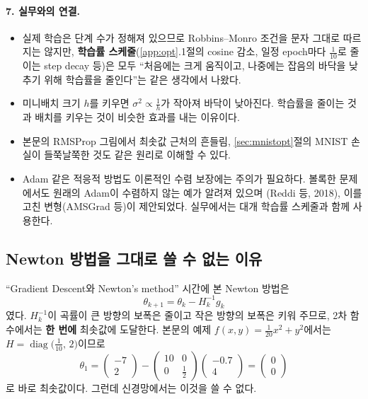 \documentclass[11pt,a4paper]{article}
\begin{document}
\paragraph{7. 실무와의 연결.}
\begin{itemize}[leftmargin=1.8em]
\item 실제 학습은 단계 수가 정해져 있으므로 Robbins--Monro 조건을 문자 그대로 따르지는 않지만,
\textbf{학습률 스케줄}(\ref{app:opt}.1절의 cosine 감소, 일정 epoch마다 $\frac1{10}$로 줄이는 step decay 등)은
모두 ``처음에는 크게 움직이고, 나중에는 잡음의 바닥을 낮추기 위해 학습률을 줄인다''는 같은 생각에서 나왔다.
\item 미니배치 크기 $h$를 키우면 $\sigma^2\propto\frac1h$가 작아져 바닥이 낮아진다.
학습률을 줄이는 것과 배치를 키우는 것이 비슷한 효과를 내는 이유이다.
\item 본문의 RMSProp 그림에서 최솟값 근처의 흔들림, \ref{sec:mnistopt}절의 MNIST 손실이 들쭉날쭉한 것도
같은 원리로 이해할 수 있다.
\item Adam 같은 적응적 방법도 이론적인 수렴 보장에는 주의가 필요하다.
볼록한 문제에서도 원래의 Adam이 수렴하지 않는 예가 알려져 있으며 (Reddi 등, 2018),
이를 고친 변형(AMSGrad 등)이 제안되었다. 실무에서는 대개 학습률 스케줄과 함께 사용한다.
\end{itemize}

\subsection{Newton 방법을 그대로 쓸 수 없는 이유}

``Gradient Descent와 Newton's method'' 시간에 본 Newton 방법은
\[
\theta_{k+1}=\theta_k-H_k^{-1}g_k
\]
였다. $H_k^{-1}$이 곡률이 큰 방향의 보폭은 줄이고 작은 방향의 보폭은 키워 주므로,
2차 함수에서는 \textbf{한 번에} 최솟값에 도달한다.
본문의 예제 $f(x,y)=\frac{1}{20}x^2+y^2$에서는 $H=\operatorname{diag}\bigl(\frac{1}{10},\,2\bigr)$이므로
\[
\theta_1=\begin{pmatrix}-7\\2\end{pmatrix}-\begin{pmatrix}10&0\\0&\tfrac12\end{pmatrix}\begin{pmatrix}-0.7\\4\end{pmatrix}
=\begin{pmatrix}0\\0\end{pmatrix}
\]
로 바로 최솟값이다. 그런데 신경망에서는 이것을 쓸 수 없다.
\end{document}
